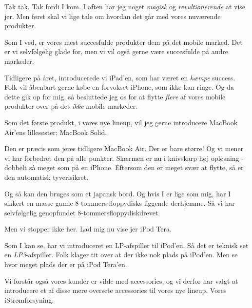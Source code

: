 \documentclass[a4paper,11pt]{article}
\begin{document}
\begin{sketch}

  Tak tak.  Tak fordi I kom.    I aften
har jeg noget \emph{magisk} og \emph{revultionerende} at vise jer.  Men først skal
vi lige tale om hvordan det går med vores nuværende produkter.

  Som I ved, er vores mest succesfulde produkter dem på det mobile
marked. 
Det er vi selvfølgelig glade for, men vi vil også gerne være
succesfulde på andre markeder.

  Tidligere på året, introducerede vi iPad'en, som har været en 
\emph{kæmpe} success.  Folk vil åbenbart gerne købe en forvokset iPhone, som ikke
kan ringe.  Og da dette gik op for mig, så besluttede jeg os for at flytte 
\emph{flere} af vores mobile produkter over på det \emph{ikke} mobile markeder.

  Som det første produkt, i vores nye lineup, vil jeg gerne introducere
MacBook Air'ens lillesøster; MacBook Solid.


  Den er præcis som jeres tidligere MacBook Air.  Der er bare større!  Og
vi mener vi har forbedret den på alle punkter.  Skærmen er nu i knivskarp høj
opløsning - dobbelt så meget som på en iPhone.  Eftersom den er meget svær at
flytte, så er den automatisk tyverisikret.

  Og så kan den bruges som et japansk bord.
Og hvis I er lige som mig, har I sikkert en masse gamle 8-tommers-floppydisks
liggende derhjemme.  Så vi har selvfølgelig genopfundet 8-tommersfloppydiskdrevet.

  Men vi stopper ikke her.  Lad mig nu vise jer iPod Tera.


  Som I kan se, har vi introduceret en LP-afspiller til iPod'en.
Så det er teknisk set en \emph{LP3}-afspiller.
Folk klager tit over at der ikke nok plads på iPod'en.  Men se hvor meget
plads der er på iPod Tera'en. 

  Vi forstår også vores kunder er vilde med accessories, og vi derfor
har valgt at introducere et af disse mere oversete accessories til vores nye 
lineup.  Vores iStrømforsyning.


\end{sketch}
\end{document}
